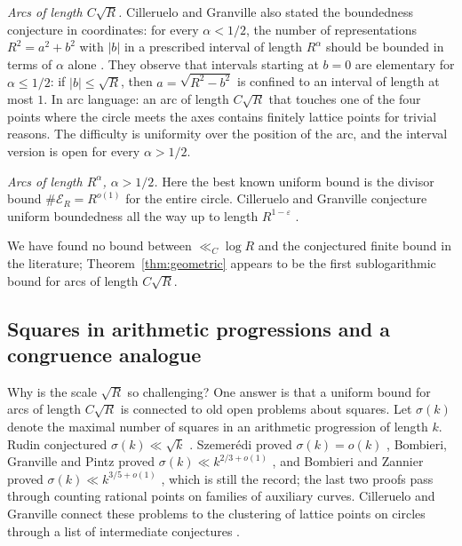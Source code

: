 \documentclass[11pt]{article}
\newcommand{\E}{\mathcal E}
\begin{document}
\emph{Arcs of length \(C\sqrt R\).}
Cilleruelo and Granville also stated the boundedness conjecture in coordinates: for every \(\alpha<1/2\), the number of representations \(R^2=a^2+b^2\) with \(|b|\) in a prescribed interval of length \(R^{\alpha}\) should be bounded in terms of \(\alpha\) alone \cite[Conjecture~13]{CillerueloGranville2007}.
They observe that intervals starting at \(b=0\) are elementary for \(\alpha\le1/2\): if \(|b|\le\sqrt R\), then \(a=\sqrt{R^2-b^2}\) is confined to an interval of length at most \(1\).
In arc language: an arc of length \(C\sqrt R\) that touches one of the four points where the circle meets the axes contains finitely lattice points for trivial reasons.
The difficulty is uniformity over the position of the arc, and the interval version is open for every \(\alpha>1/2\).

\emph{Arcs of length \(R^{\alpha}\), \(\alpha>1/2\).}
Here the best known uniform bound is the divisor bound \(\#\E_R=R^{o(1)}\) for the entire circle.
Cilleruelo and Granville conjecture uniform boundedness all the way up to length \(R^{1-\varepsilon}\) \cite[Conjecture~14]{CillerueloGranville2007}.


We have found no bound between \(\ll_C\log R\) and the conjectured finite bound in the literature; Theorem~\ref{thm:geometric} appears to be the first sublogarithmic bound for arcs of length \(C\sqrt R\).

\subsection{Squares in arithmetic progressions and a congruence analogue}
\label{subsec:squares-ap}

Why is the scale \(\sqrt R\) so challenging?
One answer is that a uniform bound for arcs of length \(C\sqrt R\) is connected to old open problems about squares.
Let \(\sigma(k)\) denote the maximal number of squares in an arithmetic progression of length \(k\).
Rudin conjectured \(\sigma(k)\ll\sqrt k\) \cite{Rudin1960}.
Szemer\'edi proved \(\sigma(k)=o(k)\) \cite{Szemeredi1974}, Bombieri, Granville and Pintz proved \(\sigma(k)\ll k^{2/3+o(1)}\) \cite{BombieriGranvillePintz1992}, and Bombieri and Zannier proved \(\sigma(k)\ll k^{3/5+o(1)}\) \cite{BombieriZannier2002}, which is still the record; the last two proofs pass through counting rational points on families of auxiliary curves.
Cilleruelo and Granville connect these problems to the clustering of lattice points on circles through a list of intermediate conjectures \cite{CillerueloGranville2007}.
\end{document}
